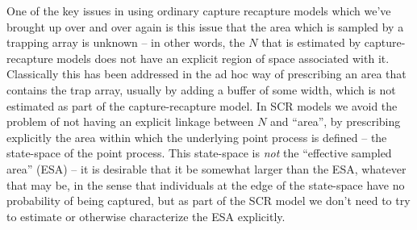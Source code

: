 {One of the key issues in using ordinary capture recapture models which
we've brought up over and over again is this issue that the area which
is sampled by a trapping array is unknown -- in other words, the $N$
that is estimated by capture-recapture models does not have an
explicit region of space associated with it.  Classically this has
been addressed in the ad hoc way of prescribing an area that contains
the trap array,  usually by adding a buffer of some width, which is not
estimated as part of the capture-recapture model.  In SCR models we
avoid the problem of not having an explicit linkage between $N$ and
``area'', by prescribing explicitly the area within which the
underlying point process is defined -- the state-space of the point
process.  This state-space is {\it not} the ``effective sampled area'' (ESA)
-- it is desirable that it be somewhat larger than the ESA, whatever
that may be, in the sense
that individuals at the edge of the state-space have no probability of
being captured, but as part of the SCR model we don't need to try to
estimate or otherwise characterize the ESA explicitly.

}
